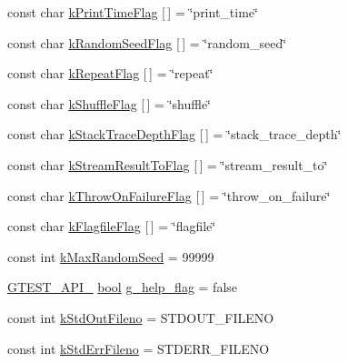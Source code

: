 \begin{DoxyCompactItemize}
\item 
const char \hyperlink{namespacetesting_1_1internal_aa6c13109bb4c78740ddb082b1ec0de56}{k\+Print\+Time\+Flag} \mbox{[}$\,$\mbox{]} = \char`\"{}print\+\_\+time\char`\"{}
\item 
const char \hyperlink{namespacetesting_1_1internal_a964ad71443cfda304b3208bf5d2daa75}{k\+Random\+Seed\+Flag} \mbox{[}$\,$\mbox{]} = \char`\"{}random\+\_\+seed\char`\"{}
\item 
const char \hyperlink{namespacetesting_1_1internal_a764ee423d39ebb8e10c53ab9b685cd9b}{k\+Repeat\+Flag} \mbox{[}$\,$\mbox{]} = \char`\"{}repeat\char`\"{}
\item 
const char \hyperlink{namespacetesting_1_1internal_affd2c1118505cb97d8ff728c95fc722b}{k\+Shuffle\+Flag} \mbox{[}$\,$\mbox{]} = \char`\"{}shuffle\char`\"{}
\item 
const char \hyperlink{namespacetesting_1_1internal_ad6f90e66d431ca3a9084408878c2cc77}{k\+Stack\+Trace\+Depth\+Flag} \mbox{[}$\,$\mbox{]} = \char`\"{}stack\+\_\+trace\+\_\+depth\char`\"{}
\item 
const char \hyperlink{namespacetesting_1_1internal_a84f8a2102d45c8b2b35be06d14ffefb8}{k\+Stream\+Result\+To\+Flag} \mbox{[}$\,$\mbox{]} = \char`\"{}stream\+\_\+result\+\_\+to\char`\"{}
\item 
const char \hyperlink{namespacetesting_1_1internal_ad9efcf363de3483afd91c7393a4fefb8}{k\+Throw\+On\+Failure\+Flag} \mbox{[}$\,$\mbox{]} = \char`\"{}throw\+\_\+on\+\_\+failure\char`\"{}
\item 
const char \hyperlink{namespacetesting_1_1internal_aa1ffe15dea227d4dded912e43a8eed84}{k\+Flagfile\+Flag} \mbox{[}$\,$\mbox{]} = \char`\"{}flagfile\char`\"{}
\item 
const int \hyperlink{namespacetesting_1_1internal_a41bd421ace53d23dbe85d9618c3afaee}{k\+Max\+Random\+Seed} = 99999
\item 
\hyperlink{gtest-port_8h_aa73be6f0ba4a7456180a94904ce17790}{G\+T\+E\+S\+T\+\_\+\+A\+P\+I\+\_\+} \hyperlink{classbool}{bool} \hyperlink{namespacetesting_1_1internal_a93a772f5e51973b105d91cbb66a203f4}{g\+\_\+help\+\_\+flag} = false
\item 
const int \hyperlink{namespacetesting_1_1internal_a24f0a3d50cac54a9132f4828ec9b96d9}{k\+Std\+Out\+Fileno} = S\+T\+D\+O\+U\+T\+\_\+\+F\+I\+L\+E\+NO
\item 
const int \hyperlink{namespacetesting_1_1internal_a747eccfdbdee3ff8af3bedc476a57c85}{k\+Std\+Err\+Fileno} = S\+T\+D\+E\+R\+R\+\_\+\+F\+I\+L\+E\+NO
\item 

\end{DoxyCompactItemize}
